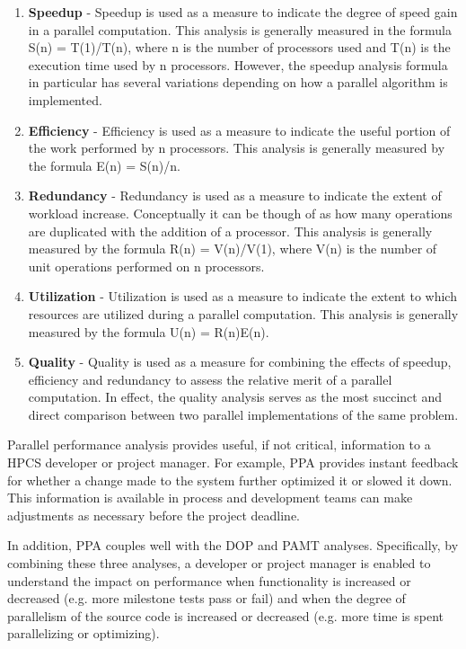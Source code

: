 \documentclass[11pt,twocolumn]{article}
\begin{document}
\begin{enumerate}
\item {\bf Speedup} - 
Speedup is used as a measure to indicate the degree of speed gain in a
parallel computation.  This analysis is generally measured in the
formula S(n) = T(1)/T(n), where n is the number of processors used and
T(n) is the execution time used by n processors.  However, the speedup
analysis formula in particular has several variations depending on how
a parallel algorithm is implemented.

\item {\bf Efficiency} -
Efficiency is used as a measure to indicate the useful portion of the
work performed by n processors.  This analysis is generally measured
by the formula E(n) = S(n)/n.

\item {\bf Redundancy} -
Redundancy is used as a measure to indicate the extent of workload
increase.  Conceptually it can be though of as how many operations are
duplicated with the addition of a processor.  This analysis is
generally measured by the formula R(n) = V(n)/V(1), where V(n) is the
number of unit operations performed on n processors.

\item {\bf Utilization} -
Utilization is used as a measure to indicate the extent to which
resources are utilized during a parallel computation.  This analysis
is generally measured by the formula U(n) = R(n)E(n).

\item {\bf Quality} -
Quality is used as a measure for combining the effects of speedup,
efficiency and redundancy to assess the relative merit of a parallel
computation.  In effect, the quality analysis serves as the most
succinct and direct comparison between two parallel implementations of
the same problem.
\end{enumerate}

Parallel performance analysis provides useful, if not critical,
information to a HPCS developer or project manager.  For example, PPA
provides instant feedback for whether a change made to the system
further optimized it or slowed it down.  This information is available
in process and development teams can make adjustments as necessary
before the project deadline.

In addition, PPA couples well with the DOP and PAMT analyses.  Specifically, by combining these three analyses, a developer or project manager is enabled to understand the impact on performance when functionality is increased or decreased (e.g. more milestone tests pass or fail) and when the degree of parallelism of the source code is increased or decreased (e.g. more time is spent parallelizing or optimizing).
\end{document}
